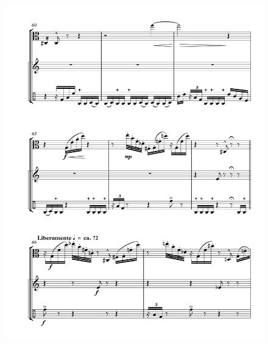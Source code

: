 \begin{figure}[htbp]
    \centering
	\includegraphics[width=6.5in]{figures/Viola_Percussion_9.pdf}
\end{figure}

